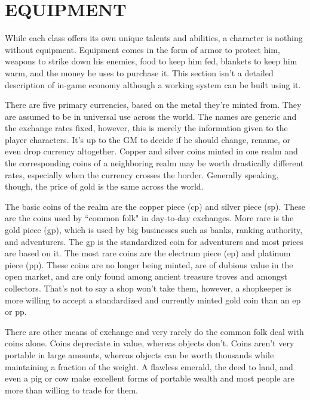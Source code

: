 \chapter{EQUIPMENT}

\begin{multicols}{2}

While each class offers its own unique talents and abilities, a character is nothing without equipment.  Equipment comes in the form of armor to protect him, weapons to strike down his enemies, food to keep him fed, blankets to keep him warm, and the money he uses to purchase it.  This section isn't a detailed description of in-game economy although a working system can be built using it.

There are five primary currencies, based on the metal they're minted from. They are assumed to be in universal use across the world.  The names are generic and the exchange rates fixed, however, this is merely the information given to the player characters.  It's up to the GM to decide if he should change, rename, or even drop currency altogether.  Copper and silver coins minted in one realm and the corresponding coins of a neighboring realm may be worth drastically different rates, especially when the currency crosses the border.  Generally speaking, though, the price of gold is the same across the world.

The basic coins of the realm are the copper piece (cp) and silver piece (sp).  These are the coins used by ``common folk" in day-to-day exchanges.  More rare is the gold piece (gp), which is used by big businesses such as banks, ranking authority, and adventurers.  The gp is the standardized coin for adventurers and most prices are based on it.  The most rare coins are the electrum piece (ep) and platinum piece (pp).  These coins are no longer being minted, are of dubious value in the open market, and are only found among ancient treasure troves and amongst collectors.  That's not to say a shop won't take them, however, a shopkeeper is more willing to accept a standardized and currently minted gold coin than an ep or pp.

There are other means of exchange and very rarely do the common folk deal with coins alone.  Coins depreciate in value, whereas objects don't.  Coins aren't very portable in large amounts, whereas objects can be worth thousands while maintaining a fraction of the weight.  A flawless emerald, the deed to land, and even a pig or cow make excellent forms of portable wealth and most people are more than willing to trade for them.


\end{multicols}
